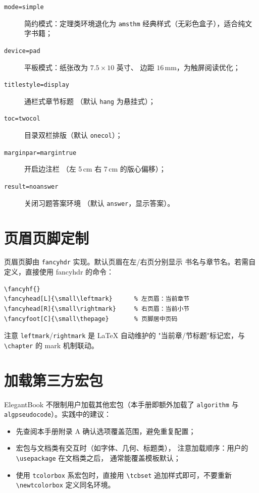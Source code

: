 \begin{description}
  \item[\texttt{mode=simple}] 简约模式：定理类环境退化为
        \texttt{amsthm} 经典样式（无彩色盒子），适合纯文字书籍；
  \item[\texttt{device=pad}] 平板模式：纸张改为 $7.5\times10$ 英寸、
        边距 $16\,\mathrm{mm}$，为触屏阅读优化；
  \item[\texttt{titlestyle=display}] 通栏式章节标题
        （默认 \texttt{hang} 为悬挂式）；
  \item[\texttt{toc=twocol}] 目录双栏排版（默认 \texttt{onecol}）；
  \item[\texttt{marginpar=margintrue}] 开启边注栏
        （左 5\,cm 右 7\,cm 的版心偏移）；
  \item[\texttt{result=noanswer}] 关闭习题答案环境
        （默认 \texttt{answer}，显示答案）。
\end{description}

\section{页眉页脚定制}

页眉页脚由 \texttt{fancyhdr} 实现。默认页眉在左/右页分别显示
书名与章节名。若需自定义，直接使用 fancyhdr 的命令：

\begin{lstlisting}
\fancyhf{}
\fancyhead[L]{\small\leftmark}      % 左页眉：当前章节
\fancyhead[R]{\small\rightmark}     % 右页眉：当前小节
\fancyfoot[C]{\small\thepage}       % 页脚居中页码
\end{lstlisting}

注意 \texttt{leftmark}/\texttt{rightmark} 是 LaTeX 自动维护的
"当前章/节标题"标记宏，与 \verb|\chapter| 的 mark 机制联动。

\section{加载第三方宏包}

ElegantBook 不限制用户加载其他宏包（本手册即额外加载了
\texttt{algorithm} 与 \texttt{algpseudocode}）。实践中的建议：

\begin{itemize}
  \item 先查阅本手册附录 A 确认选项覆盖范围，避免重复配置；
  \item 宏包与文档类有交互时（如字体、几何、标题类），
        注意加载顺序：用户的 \verb|\usepackage| 在文档类之后，
        通常能覆盖模板默认；
  \item 使用 \texttt{tcolorbox} 系宏包时，直接用
        \texttt{\textbackslash tcbset} 追加样式即可，不要重新
        \texttt{\textbackslash newtcolorbox} 定义同名环境。
\end{itemize}

